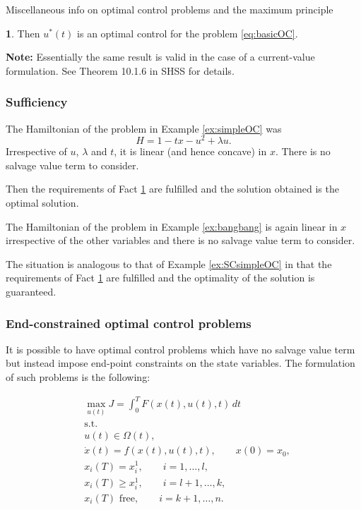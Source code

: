 \documentclass[10pt]{beamer}
\theoremstyle{definition}
\newtheorem{Fact}{\translate{Fact}}
\begin{document}
\begin{section}{Miscellaneous info on optimal control problems and the maximum principle}
\begin{frame}[fragile]
\begin{Fact}
Then $ u^*(t) $ is an optimal control for the problem \eqref{eq:basicOC}.
\label{fc:SCs}
\end{Fact}\bigskip

\textbf{Note:} Essentially the same result is valid in the case of a current-value formulation. See Theorem 10.1.6 in SHSS for details.
\end{frame}

\begin{frame}[fragile]
\frametitle{Sufficiency}
\begin{example}
The Hamiltonian of the problem in Example \ref{ex:simpleOC} was \[ H = 1-tx-u^2+\lambda u. \] Irrespective of $ u $, $ \lambda $ and $ t $, it is linear (and hence concave) in $ x $. There is no salvage value term to consider.

Then the requirements of Fact \ref{fc:SCs} are fulfilled and the solution obtained is the optimal solution.
\label{ex:SCsimpleOC}
\end{example}

\begin{example}
The Hamiltonian of the problem in Example \ref{ex:bangbang} is again linear in $ x $ irrespective of the other variables and there is no salvage value term to consider.

The situation is analogous to that of Example \ref{ex:SCsimpleOC} in that the requirements of Fact \ref{fc:SCs} are fulfilled and the optimality of the solution is guaranteed.
\label{ex:SCbangbang}
\end{example}
\end{frame}

\begin{frame}[fragile]
\frametitle{End-constrained optimal control problems}
It is possible to have optimal control problems which have no salvage value term but instead impose end-point constraints on the state variables. The formulation of such problems is the following: 

\begin{equation}
\begin{split}
& \max_{u(t)} J = \int_{0}^{T}F(x(t),u(t),t)\,dt  \\
&\text{s.t.}\\
& u(t)\in \Omega(t) ,\\
& \dot{x}(t)=f(x(t),u(t),t),\qquad x(0)=x_0,\\
& x_i(T) = x^1_i,\qquad i=1,\ldots,l,\\
& x_i(T) \geq x^1_i,\qquad i=l+1,\ldots,k,\\
& x_i(T) \text{ free},\qquad i=k+1,\ldots,n.\\
\end{split}
\label{eq:endconstrOC}
\end{equation}
\end{frame}


\end{section}
\end{document}
